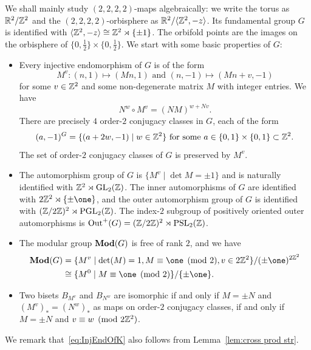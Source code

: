 \documentclass{amsart}
\begin{document}
We shall mainly study $(2,2,2,2)$-maps algebraically: we write the
torus as ${\mathbb R}^2/{\mathbb Z}^2$ and the $(2,2,2,2)$-orbisphere as
${\mathbb R}^2/\langle{\mathbb Z}^2,-z\rangle$. Its fundamental group $G$ is identified
with $\langle{\mathbb Z}^2,-z\rangle\cong{\mathbb Z}^2\rtimes\{\pm1\}$. The orbifold
points are the images on the orbisphere of
$\{0,\tfrac12\}\times\{0,\tfrac12\}$.  We start with some basic
properties of $G$:
\begin{prop}\label{prop:EndOfG}
  \begin{itemize}
  \item[(A)] Every injective endomorphism of $G$ is of the form
    \begin{equation}\label{eq:InjEndOfK}
      M^{v}\colon (n,1)\mapsto(M n,1)\text{ and }(n,-1)\mapsto(M n+v,-1)
    \end{equation}
    for some $v\in{\mathbb Z}^2$ and some non-degenerate matrix $M$ with
    integer entries. We have
    \[ N^w\circ M^v= (N M)^{w+N v}.\]There are precisely $4$ order-$2$ conjugacy
    classes in $G$, each of the form
    \[(a,-1)^G=\{(a+2w,-1)\mid w\in{\mathbb Z}^2\}\text{ for some }a\in\{0,1\}\times\{0,1\}\subset{\mathbb Z}^2.
    \]
    The set of order-$2$ conjugacy classes of $G$ is preserved by $M^{v}$.
  \item[(B)] The automorphism group of $G$ is $\{M^v\mid\det M=\pm1\}$
    and is naturally identified with
    ${\mathbb Z}^2\rtimes\operatorname{GL}_2({\mathbb Z})$. The inner automorphisms of
    $G$ are identified with $2\Z^2\rtimes\{\pm\one\}$, and the outer
    automorphism group of $G$ is identified with
    $({\mathbb Z}/2{\mathbb Z})^2\rtimes\operatorname{PGL}_2({\mathbb Z})$. The index-$2$
    subgroup of positively oriented outer automorphisms is
    $\operatorname{Out}^+(G)=({\mathbb Z}/2{\mathbb Z})^2\rtimes\operatorname{PSL}_2({\mathbb Z})$.
  \item[(C)] The modular group $\mathbf{\relax Mod}(G)$ is free of rank $2$, and we have
    \begin{align*}
      \Mod(G)&=\{M^v\mid\det(M)=1,M\equiv\one\pmod2,v\in2\Z^2\}/(\pm\one)^{2\Z^2}\\
      &\cong\{M^0\mid M\equiv\one\pmod2\}/\{\pm\one\}.
    \end{align*}
  \item[(D)] Two bisets $B_{M^v}$ and $B_{N^w}$ are isomorphic if and
    only if $M=\pm N$ and $(M^v)_*=(N^w)_*$ as maps on order-$2$
    conjugacy classes, if and only if $M=\pm N$ and $v\equiv w\pmod{2{\mathbb Z}^2}$.
  \end{itemize}
\end{prop}
We remark that~\eqref{eq:InjEndOfK} also follows from
Lemma~\ref{lem:cross prod str}.
\end{document}
